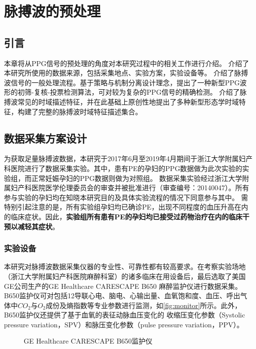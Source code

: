 \chapter{脉搏波的预处理}
\section{引言}
本章将从PPG信号的预处理的角度对本研究过程中的相关工作进行介绍。
介绍了本研究所使用的数据来源，包括采集地点、实验方案，实验设备等。
介绍了脉搏波信号的一般处理流程。基于策略与机制分离设计理念，提出了一种新型PPG波形的初筛-复核-投票检测算法，可对较为复杂的PPG信号的精确检测。
介绍了脉搏波常见的时域描述特征，并在此基础上原创性地提出了多种新型形态学时域特征，构建了完整的脉搏波时域特征描述集合。
\section{数据采集方案设计}
为获取足量脉搏波数据，本研究于2017年6月至2019年4月期间于浙江大学附属妇产科医院进行了数据采集实验。其中，患有PE的孕妇的PPG数据做为此次实验的实验组，而正常妊娠孕妇的PPG数据则做为对照组。
数据采集实验经过浙江大学附属妇产科医院医学伦理委员会的审查并被批准进行（审查编号：20140047）。所有参与实验的孕妇均在知晓本研究目的及具体实验流程的情况下同意参与其中。
需特别引起注意的是，所有实验组孕妇均已确诊PE，出现不同程度的血压升高在内的临床症状。因此，\textbf{实验组所有患有PE的孕妇均已接受过药物治疗在内的临床干预以减轻其症状}。
\subsection{实验设备}
本研究对脉搏波数据采集仪器的专业性、可靠性都有较高要求。在考察实验场地（浙江大学附属妇产科医院麻醉科室）的诸多临床在用设备后，最后选取了美国GE公司生产的GE Healthcare CARESCAPE B650 麻醉监护仪进行数据采集。
B650监护仪可对包括12导联心电、脑电、心输出量、血氧饱和度、血压、呼出气体中$CO_{2}$与$O_{2}$成份及熵指数等专业参数进行监测，如\autoref{fig:monitor}所示。此外，B650监护仪还提供了基于血氧的表征动脉血压变化的
收缩压变化参数（Systolic pressure variation，SPV）和脉压变化参数（pulse pressure variation，PPV）\cite{GE2021,Michard1999}。
\begin{figure}[htbp]
      \centering
      \quad
      \caption{\label{fig:monitor}GE Healthcare CARESCAPE B650监护仪}
\end{figure}
